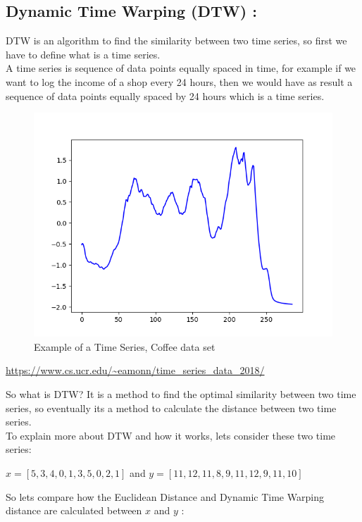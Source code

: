 \documentclass[10pt,a4paper]{article}
\begin{document}
\subsection{Dynamic Time Warping (DTW) :}
DTW is an algorithm to find the similarity between two time series, so first we have to define what is a time series.\\
A time series is sequence of data points equally spaced in time, for example if we want to log the income of a shop every 24 hours, then we would have as result a sequence of data points equally spaced by 24 hours which is a time series.
\begin{figure}[H]
\centering
\includegraphics[scale=0.5]{Coffee.png}
\caption{Example of a Time Series, Coffee data set}
\end{figure}
\begin{center}
\textcolor{blue}{\small\url{https://www.cs.ucr.edu/~eamonn/time_series_data_2018/}}
\end{center}
So what is DTW? It is a method to find the optimal similarity between two time series, so eventually its a method to calculate the distance between two time series.\\
To explain more about DTW and how it works, lets consider these two time series:

\begin{center}
$ x = [5,3,4,0,1,3,5,0,2,1] $ and $ y = [11,12,11,8,9,11,12,9,11,10] $
\end{center}

So lets compare how the Euclidean Distance and Dynamic Time Warping distance are calculated between $ x $ and $ y $ :
\end{document}
